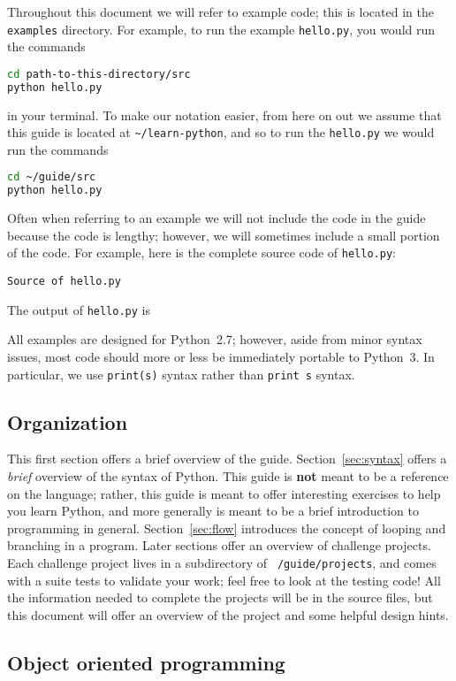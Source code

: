 \documentclass{article}
\newcommand{\example}[1]{%
  \par
  \vspace{.5em}
  \noindent \texttt{Source of #1}
  
  \vspace{.5em}
}
\newcommand{\exampleoutput}[1]{%
  \par
  \vspace{.5em}
  
  \vspace{.5em}
}
\begin{document}
Throughout this document we will refer to example code; this is
located in the \texttt{examples} directory. For example, to run the
example \texttt{hello.py}, you would run the commands
\begin{lstlisting}[language=bash]
cd path-to-this-directory/src
python hello.py
\end{lstlisting}
in your terminal. To make our notation easier, from here on out we
assume that this guide is located at \texttt{\~{}/learn-python}, and
so to run the \texttt{hello.py} we would run the commands
\begin{lstlisting}[language=bash]
cd ~/guide/src
python hello.py
\end{lstlisting}
Often when referring to an example we will not include the code in the
guide because the code is lengthy; however, we will sometimes include
a small portion of the code. For example, here is the complete source
code of \texttt{hello.py}:
\example{hello.py}
The output of \texttt{hello.py} is
\exampleoutput{hello.out}
All examples are designed for Python~2.7; however, aside from minor
syntax issues, most code should more or less be immediately portable
to Python~3. In particular, we use \texttt{print(s)} syntax rather
than \texttt{print s} syntax.

\subsection{Organization}

This first section offers a brief overview of the
guide. Section~\ref{sec:syntax} offers a \textit{brief} overview of
the syntax of Python. This guide is \textbf{not} meant to be a
reference on the language; rather, this guide is meant to offer
interesting exercises to help you learn Python, and more generally is
meant to be a brief introduction to programming in
general. Section~\ref{sec:flow} introduces the concept of looping and
branching in a program. Later sections offer an overview of challenge
projects. Each challenge project lives in a subdirectory of
\texttt{~/guide/projects}, and comes with a suite tests to validate
your work; feel free to look at the testing code! All the information
needed to complete the projects will be in the source files, but this
document will offer an overview of the project and some helpful design
hints.

\subsection{Object oriented programming}
\end{document}

